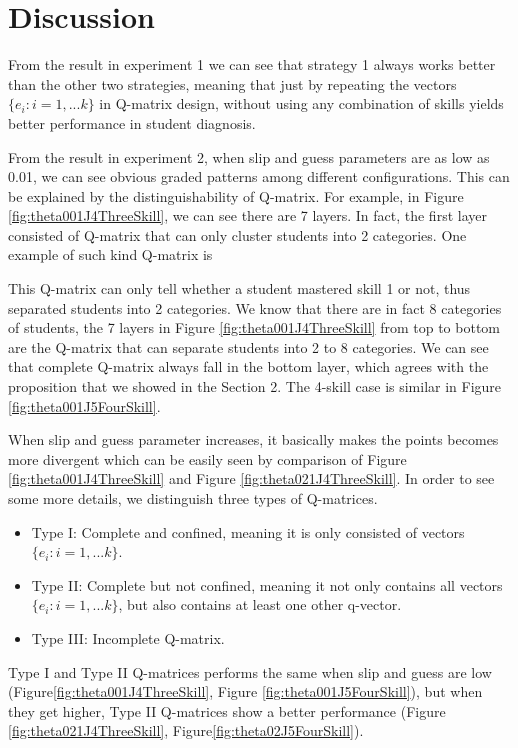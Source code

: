 \documentclass{edm_template}
\begin{document}
%  

\section{Discussion}
From the result in experiment 1 we can see that strategy 1 always works better than the other two strategies, meaning that just by repeating the vectors $\{e_{i}:i=1,...k\}$ in Q-matrix design, without using any combination of skills yields better performance in student diagnosis. 

From the result in experiment 2, when slip and guess parameters are as low as 0.01, we can see obvious graded patterns among different configurations. This can be explained by the distinguishability of Q-matrix. For example, in Figure \ref{fig:theta001J4ThreeSkill}, we can see there are 7 layers. In fact, the first layer consisted of Q-matrix that can only cluster students into 2 categories. One example of such kind Q-matrix is

This Q-matrix can only tell whether a student mastered skill 1 or not, thus separated students into 2 categories. We know that there are in fact 8 categories of students, the 7 layers in Figure \ref{fig:theta001J4ThreeSkill} from top to bottom are the Q-matrix that can separate students into 2 to 8 categories. We can see that complete Q-matrix always fall in the bottom layer, which agrees with the proposition that we showed in the Section 2. The 4-skill case is similar in Figure \ref{fig:theta001J5FourSkill}.

When slip and guess parameter increases, it basically makes the points becomes more divergent which can be easily seen by comparison of Figure \ref{fig:theta001J4ThreeSkill} and Figure \ref{fig:theta021J4ThreeSkill}. In order to see some more details, we distinguish three types of Q-matrices. 
\begin{itemize}
\item Type I: Complete and confined, meaning it is only consisted of vectors $\{e_{i}:i=1,...k\}$.
\item Type II: Complete but not confined, meaning it not only contains all vectors $\{e_{i}:i=1,...k\}$, but also contains at least one other q-vector.
\item Type III: Incomplete Q-matrix.
\end{itemize}
Type I and Type II Q-matrices performs the same when slip and guess are low (Figure\ref{fig:theta001J4ThreeSkill}, Figure \ref{fig:theta001J5FourSkill}), but when they get higher, Type II Q-matrices show a better performance (Figure \ref{fig:theta021J4ThreeSkill}, Figure\ref{fig:theta02J5FourSkill}).
\end{document}
